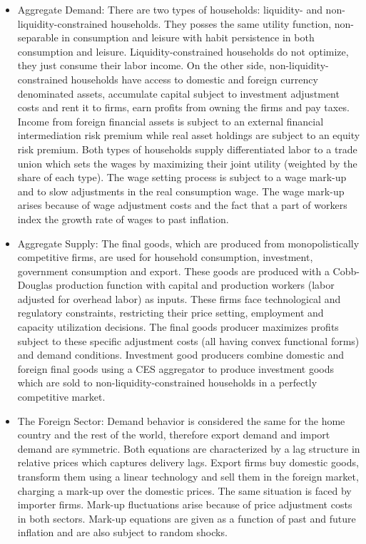 \documentclass[11pt,a4paper]{article}
\begin{document}
	\begin{itemize}
		
		\item Aggregate Demand: There are two types of households: liquidity- and non-liquidity-constrained households. They posses the same utility function, non-separable in consumption and leisure with habit persistence in both consumption and leisure. Liquidity-constrained households do not optimize, they just consume their labor income. On the other side, non-liquidity-constrained households have access to domestic and foreign currency denominated assets, accumulate capital subject to investment adjustment costs and rent it to firms, earn profits from owning the firms and pay taxes. Income from foreign financial assets is subject to an external financial intermediation risk premium while real asset holdings are subject to an equity risk premium. Both types of households supply differentiated labor to a trade union which sets the wages by maximizing their joint utility (weighted by the share of each type). The wage setting process is subject to a wage mark-up and to slow adjustments in the real consumption wage. The wage mark-up arises because of wage adjustment costs and the fact that a part of workers index the growth rate of wages to past inflation.
		
		\item Aggregate Supply: The final goods, which are produced from monopolistically competitive firms, are used for household
		consumption, investment, government consumption and export. These goods are produced with a Cobb-Douglas production function with capital and production workers (labor adjusted for overhead labor) as inputs. These firms face technological and regulatory constraints, restricting their price setting, employment and capacity utilization decisions. The final goods producer maximizes profits subject to these specific adjustment costs (all having convex functional forms) and demand conditions. Investment good producers combine domestic and foreign final goods using a CES aggregator to produce investment goods which are sold to non-liquidity-constrained households in a perfectly competitive market.
		
		\item The Foreign Sector: Demand behavior is considered the same for the home country and the rest of the world, therefore export demand and import demand are symmetric. Both equations are characterized by a lag structure in relative prices which captures delivery lags. Export firms buy domestic goods, transform them using a linear technology and sell them in the foreign market, charging a mark-up over the domestic prices. The same situation is faced by importer firms. Mark-up fluctuations arise because of price adjustment costs in both sectors. Mark-up equations are given as a function of past and future inflation and are also subject to random shocks.
		

\end{itemize}
\end{document}
